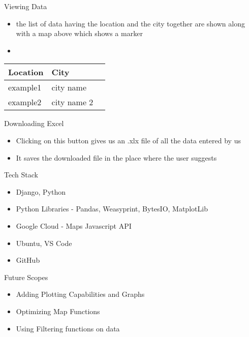 \documentclass{beamer}
\begin{document}
\begin{frame}{Viewing Data}
  \begin{itemize}
    \item the list of data having the location and the city together are shown along with a map above which shows a marker 
    \item{}
    
 \end{itemize} 
\begin{tabular}{lll}
\textbf{Location} & \textbf{City}  \\ \hline
example1 & city name \\
example2 & city name 2   
\end{tabular}

\end{frame}
\begin{frame}{Downloading Excel}
  \begin{itemize}
    \item Clicking on this button gives us an .xlx file of all the data entered by us
    \item It saves the downloaded file in the place where the user suggests
  \end{itemize}
\end{frame}

\begin{frame}{Tech Stack}
  \begin{itemize}
    \item Django, Python
    \item Python Libraries - Pandas, Weasyprint, BytesIO, MatplotLib 
    \item Google Cloud - Maps Javascript API 
    \item Ubuntu, VS Code
    \item GitHub
    
  \end{itemize}
\end{frame}
\begin{frame}{Future Scopes}
  \begin{itemize}
    \item Adding Plotting Capabilities and Graphs
    \item Optimizing Map Functions
    \item Using Filtering functions on data 
  \end{itemize}
\end{frame}
\end{document}
